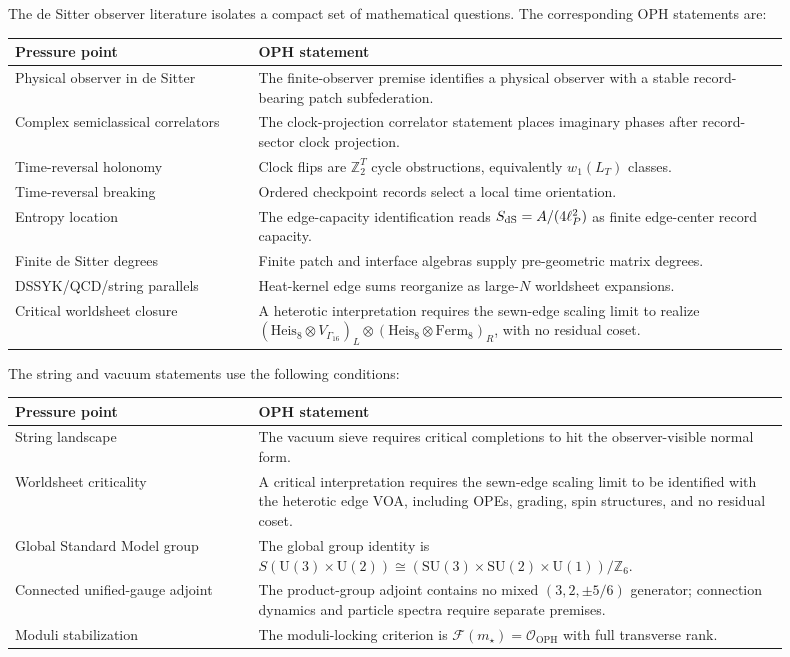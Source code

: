 \documentclass[11pt]{article}
\theoremstyle{remark}
\theoremstyle{plain}
\newcommand{\OPH}{\mathrm{OPH}}
\newcommand{\SU}{\mathrm{SU}}
\newcommand{\U}{\mathrm{U}}
\newcommand{\Z}{\mathbb Z}
\newcommand{\calF}{\mathcal F}
\newcommand{\calO}{\mathcal O}
\begin{document}
The de Sitter observer literature isolates a compact set of mathematical questions. The
corresponding OPH statements are:
\begin{center}
\small
\begin{tabular}{L{0.29\linewidth}L{0.61\linewidth}}
\toprule
\textbf{Pressure point} & \textbf{OPH statement} \\
\midrule
Physical observer in de Sitter & The finite-observer premise identifies a physical observer with a stable
record-bearing patch subfederation. \\
Complex semiclassical correlators & The clock-projection correlator statement places imaginary phases
after record-sector clock projection. \\
Time-reversal holonomy & Clock flips are \(\Z_2^T\) cycle obstructions,
equivalently \(w_1(L_T)\) classes. \\
Time-reversal breaking & Ordered checkpoint records select a local time
orientation. \\
Entropy location & The edge-capacity identification reads \(S_{\rm dS}=A/(4\ell_P^2)\) as finite edge-center
record capacity. \\
Finite de Sitter degrees & Finite patch and interface
algebras supply pre-geometric matrix degrees. \\
DSSYK/QCD/string parallels & Heat-kernel edge sums reorganize as
large-\(N\) worldsheet expansions. \\
Critical worldsheet closure & A heterotic interpretation requires the sewn-edge scaling limit to
realize \((\mathrm{Heis}_8\otimes V_{\Gamma_{16}})_L\otimes
(\mathrm{Heis}_8\otimes\mathrm{Ferm}_8)_R\), with no residual coset. \\
\bottomrule
\end{tabular}
\end{center}

The string and vacuum statements use the following conditions:
\begin{center}
\small
\begin{tabular}{L{0.29\linewidth}L{0.61\linewidth}}
\toprule
\textbf{Pressure point} & \textbf{OPH statement} \\
\midrule
String landscape & The vacuum sieve requires critical completions to hit the observer-visible
normal form. \\
Worldsheet criticality & A critical interpretation requires the sewn-edge scaling limit to be
identified with the heterotic edge VOA, including OPEs, grading, spin structures, and no residual
coset. \\
Global Standard Model group & The global group identity is
\(S(\U(3)\times\U(2))\cong(\SU(3)\times\SU(2)\times\U(1))/\Z_6\). \\
Connected unified-gauge adjoint & The product-group adjoint
contains no mixed \((3,2,\pm5/6)\) generator; connection dynamics and particle spectra require separate premises. \\
Moduli stabilization & The moduli-locking criterion is
\(\calF(m_\star)=\calO_{\OPH}\) with full transverse rank. \\
\bottomrule
\end{tabular}
\end{center}
\end{document}
